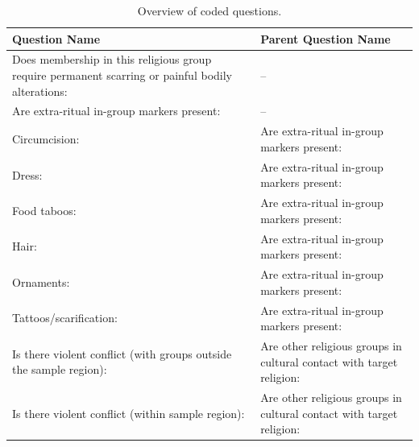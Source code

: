 \begin{table}[ht]
\centering
\small
\renewcommand{\arraystretch}{1.2}
\caption{Overview of coded questions.}
\begin{tabular}{p{6.5cm}p{6.5cm}}
\toprule
Question Name & Parent Question Name \\
\midrule
Does membership in this religious group require permanent scarring or painful bodily alterations: & -- \\
Are extra-ritual in-group markers present: & -- \\
\hspace{1em}Circumcision: & Are extra-ritual in-group markers present: \\
\hspace{1em}Dress: & Are extra-ritual in-group markers present: \\
\hspace{1em}Food taboos: & Are extra-ritual in-group markers present: \\
\hspace{1em}Hair: & Are extra-ritual in-group markers present: \\
\hspace{1em}Ornaments: & Are extra-ritual in-group markers present: \\
\hspace{1em}Tattoos/scarification: & Are extra-ritual in-group markers present: \\
Is there violent conflict (with groups outside the sample region): & Are other religious groups in cultural contact with target religion: \\
Is there violent conflict (within sample region): & Are other religious groups in cultural contact with target religion: \\
\bottomrule
\end{tabular}
\end{table}